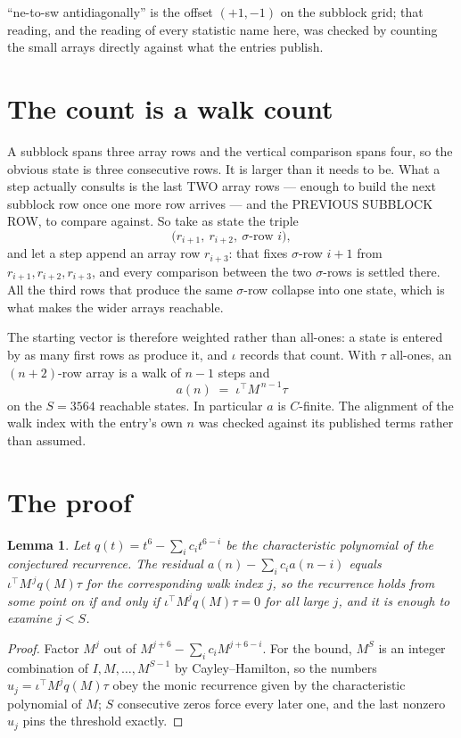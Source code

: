 \documentclass[11pt,a4paper]{article}
\theoremstyle{plain}
\newtheorem{lemma}[theorem]{Lemma}
\theoremstyle{definition}
\begin{document}
``ne-to-sw antidiagonally'' is the offset $(+1,-1)$ on the subblock grid; that reading, and
the reading of every statistic name here, was checked by counting the small arrays directly
against what the entries publish.

\section{The count is a walk count}

A subblock spans three array rows and the vertical comparison spans four, so the obvious state
is three consecutive rows. It is larger than it needs to be. What a step actually consults is
the last TWO array rows --- enough to build the next subblock row once one more row arrives ---
and the PREVIOUS SUBBLOCK ROW, to compare against. So take as state the triple
\[
\bigl(r_{i+1},\ r_{i+2},\ \sigma\text{-row }i\bigr),
\]
and let a step append an array row $r_{i+3}$: that fixes $\sigma$-row $i+1$ from
$r_{i+1},r_{i+2},r_{i+3}$, and every comparison between the two $\sigma$-rows is settled
there. All the third rows that produce the same $\sigma$-row collapse into one state, which is
what makes the wider arrays reachable.

The starting vector is therefore weighted rather than all-ones: a state is entered by as many
first rows as produce it, and $\iota$ records that count. With $\tau$ all-ones, an
$(n+2)$-row array is a walk of $n-1$ steps and
\[
a(n)\;=\;\iota^{\!\top}M^{\,n-1}\tau
\]
on the $S=3564$ reachable states. In particular $a$ is $C$-finite. The alignment of the walk
index with the entry's own $n$ was checked against its published terms rather than assumed.

\section{The proof}

\begin{lemma}\label{lem:crit}
Let $q(t)=t^{6}-\sum_i c_it^{6-i}$ be the characteristic polynomial of the
conjectured recurrence. The residual $a(n)-\sum_ic_ia(n-i)$ equals
$\iota^{\!\top}M^{\,j}q(M)\tau$ for the corresponding walk index $j$, so the recurrence
holds from some point on if and only if $\iota^{\!\top}M^{j}q(M)\tau=0$ for all large $j$,
and it is enough to examine $j<S$.
\end{lemma}

\begin{proof}
Factor $M^{j}$ out of $M^{j+6}-\sum_ic_iM^{j+6-i}$. For the bound, $M^{S}$
is an integer combination of $I,M,\dots,M^{S-1}$ by Cayley--Hamilton, so the numbers
$u_j=\iota^{\!\top}M^{j}q(M)\tau$ obey the monic recurrence given by the characteristic
polynomial of $M$; $S$ consecutive zeros force every later one, and the last nonzero $u_j$
pins the threshold exactly.
\end{proof}
\end{document}

